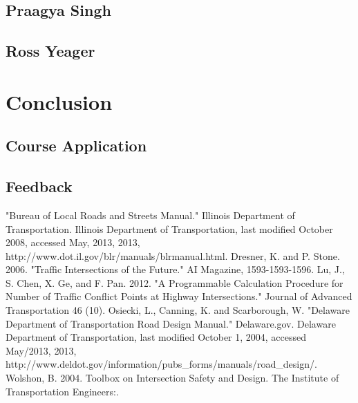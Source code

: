 \documentclass[10pt]{article}
\begin{document}
\subsection{Praagya Singh}

\subsection{Ross Yeager}

\section{Conclusion}

\subsection{Course Application}

\subsection{Feedback}

\begin{thebibliography}{100}
 "Bureau of Local Roads and Streets Manual." Illinois Department of Transportation. Illinois Department of Transportation, last modified October 2008, accessed May, 2013, 2013, http://www.dot.il.gov/blr/manuals/blrmanual.html.
 Dresner, K. and P. Stone. 2006. "Traffic Intersections of the Future." AI Magazine, 1593-1593-1596.
 Lu, J., S. Chen, X. Ge, and F. Pan. 2012. "A Programmable Calculation Procedure for Number of Traffic Conflict Points at Highway Intersections." Journal of Advanced Transportation 46 (10).
 Osiecki, L., Canning, K. and Scarborough, W. "Delaware Department of Transportation Road Design Manual." Delaware.gov. Delaware Department of Transportation, last modified October 1, 2004, accessed May/2013, 2013, http://www.deldot.gov/information/pubs_forms/manuals/road_design/.
 Wolshon, B. 2004. Toolbox on Intersection Safety and Design. The Institute of Transportation Engineers:.
\end{thebibliography}
\end{document}
